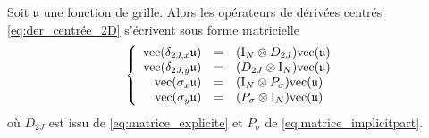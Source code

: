 \begin{proposition}
Soit $\mathfrak{u}$ une fonction de grille. Alors les opérateurs de dérivées centrés \eqref{eq:der_centrée_2D} s'écrivent sous forme matricielle
\begin{equation}
\left\lbrace
\begin{array}{rcl}
\text{vec}(\delta_{2J,x} \mathfrak{u}) & = & (\text{I}_N \otimes D_{2J}) \text{vec}(\mathfrak{u})\\
\text{vec}(\delta_{2J,y} \mathfrak{u}) & = & (D_{2J} \otimes \text{I}_N) \text{vec}(\mathfrak{u})\\
\text{vec}(\sigma_x \mathfrak{u}) & = & (\text{I}_N \otimes P_{\sigma}) \text{vec}(\mathfrak{u})\\
\text{vec}(\sigma_y \mathfrak{u}) & = & (P_{\sigma} \otimes \text{I}_N) \text{vec}(\mathfrak{u})\\
\end{array}\right.
\end{equation}
où $D_{2J}$ est issu de \eqref{eq:matrice_explicite} et $P_{\sigma}$ de \eqref{eq:matrice_implicitpart}.
\label{prop:op_der_simpson_mat}
\end{proposition}

